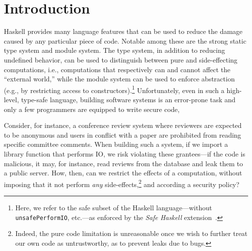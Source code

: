 \section{Introduction}
\label{sec:intro}

Haskell provides many language features that can be used to reduce the
damage caused by any particular piece of code.
%
Notable among these are the strong static type system and module
system.
%
The type system, in addition to reducing undefined behavior, can be
used to distinguish between pure and side-effecting computations,
i.e., computations that respectively can and cannot affect the
``external world,'' while the module system can be used to enforce
abstraction (e.g., by restricting access to constructors).\footnote{
  Here, we refer to the safe subset of the Haskell language---without
  \texttt{unsafePerformIO}, etc.---as enforced by
  the \emph{Safe Haskell} extension~\cite{safehaskell}.
}
%
Unfortunately, even in such a high-level, type-safe language, building
software systems is an error-prone task and only a few programmers are
equipped to write secure code,
 
Consider, for instance, a conference review system where reviewers are
expected to be anonymous and users in conflict with a paper are
prohibited from reading specific committee comments.
%
When building such a system, if we import a library function that
performs IO, we risk violating these grantees---if the code is
malicious, it may, for instance, read reviews from the database and
leak them to a public server.
%
How, then, can we restrict the effects of a computation, without
imposing that it not perform \emph{any} side-effects,\footnote{
  Indeed, the pure code limitation is unreasonable once we wish to
  further treat our own code as untrustworthy, as to prevent leaks due
  to bugs.
} and according a security policy?

